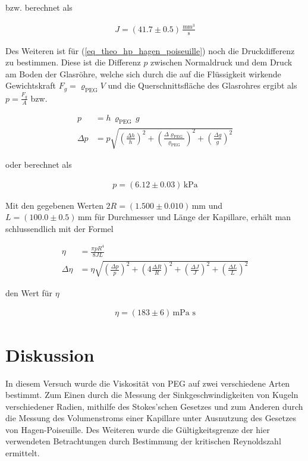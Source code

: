\documentclass[12pt,a4paper,german]{scrartcl}
\numberwithin{equation}{section}
\begin{document}
  bzw. berechnet als

  \begin{align}
    J = (41.7 \pm 0.5) \, \frac{\text{mm}^3}{\text{s}}
  \end{align}

  Des Weiteren ist für (\ref{eq_theo_hp_hagen_poiseuille}) noch die Druckdifferenz zu bestimmen.
  Diese ist die Differenz $p$ zwischen Normaldruck und dem Druck am Boden der Glasröhre, welche sich durch die auf die Flüssigkeit wirkende Gewichtskraft $F_g = \varrho_\text{PEG} V$ und die Querschnittsfläche des Glasrohres ergibt als $p = \frac{F_g}{A}$ bzw.

  \begin{align}
    p &= h \, \varrho_\text{PEG} \, g \nonumber \\
    \Delta p &= p \sqrt{\left(\frac{\Delta h}{h} \right)^2 + \left(\frac{\Delta \varrho_\text{PEG}}{\varrho_\text{PEG}} \right)^2 + \left(\frac{\Delta g}{g} \right)^2}
  \end{align}

  oder berechnet als
  
  \begin{align}
    p = (6.12 \pm 0.03) \, \text{kPa}
  \end{align}

  Mit den gegebenen Werten $2R = (1.500 \pm 0.010) \, \text{mm}$ und $L = (100.0 \pm 0.5) \, \text{mm}$ für Durchmesser und Länge der Kapillare, erhält man schlussendlich mit der Formel

  \begin{align}
    \eta &= \frac{\pi p R^4}{8 J L} \nonumber \\
    \Delta \eta &= \eta \sqrt{\left(\frac{\Delta p}{p} \right)^2 + \left(4 \frac{\Delta R}{R} \right)^2 + \left(\frac{\Delta J}{J} \right)^2 + \left(\frac{\Delta L}{L} \right)^2}
  \end{align}

  den Wert für $\eta$

  \begin{align}
    \eta = (183 \pm 6) \, \text{mPa s}
  \end{align}

  \newpage
  \section{Diskussion}
  In diesem Versuch wurde die Viskosität von PEG auf zwei verschiedene Arten bestimmt.
  Zum Einen durch die Messung der Sinkgeschwindigkeiten von Kugeln verschiedener Radien, mithilfe des Stokes'schen Gesetzes und zum Anderen durch die Messung des Volumenstroms einer Kapillare unter Ausnutzung des Gesetzes von Hagen-Poiseuille.
  Des Weiteren wurde die Gültigkeitsgrenze der hier verwendeten Betrachtungen durch Bestimmung der kritischen Reynoldszahl ermittelt.
\end{document}
